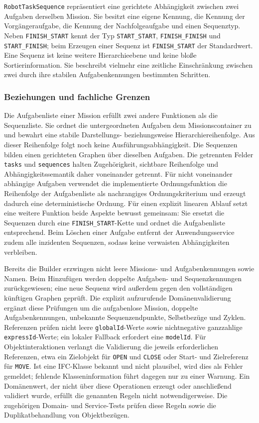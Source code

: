 \texttt{RobotTaskSequence} repräsentiert eine gerichtete Abhängigkeit zwischen zwei Aufgaben derselben Mission. Sie
besitzt eine eigene Kennung, die Kennung der Vorgängeraufgabe, die Kennung der Nachfolgeaufgabe und einen Sequenztyp.
Neben \texttt{FINISH\_START} kennt der Typ \texttt{START\_START}, \texttt{FINISH\_FINISH} und \texttt{START\_FINISH}; beim
Erzeugen einer Sequenz ist \texttt{FINISH\_START} der Standardwert. Eine Sequenz ist keine weitere Hierarchieebene und keine bloße
Sortierinformation. Sie beschreibt vielmehr eine zeitliche Einschränkung zwischen zwei durch ihre stabilen
Aufgabenkennungen bestimmten Schritten.

\subsubsection{Beziehungen und fachliche Grenzen}

Die Aufgabenliste einer Mission erfüllt zwei andere Funktionen als die Sequenzliste. Sie ordnet die untergeordneten
Aufgaben dem Missionscontainer zu und bewahrt eine stabile Darstellungs- beziehungsweise Hierarchiereihenfolge. Aus
dieser Reihenfolge folgt noch keine Ausführungsabhängigkeit. Die Sequenzen bilden einen gerichteten Graphen über
dieselben Aufgaben. Die getrennten Felder \texttt{tasks} und \texttt{sequences} halten Zugehörigkeit, sichtbare
Reihenfolge und Abhängigkeitssemantik daher voneinander getrennt. Für nicht voneinander abhängige Aufgaben verwendet
die implementierte Ordnungsfunktion die Reihenfolge der Aufgabenliste als nachrangiges Ordnungskriterium und erzeugt
dadurch eine deterministische Ordnung. Für einen explizit linearen Ablauf setzt eine weitere Funktion beide Aspekte
bewusst gemeinsam: Sie ersetzt die Sequenzen durch eine \texttt{FINISH\_START}-Kette und ordnet die Aufgabenliste
entsprechend. Beim Löschen einer Aufgabe entfernt der Anwendungsservice zudem alle inzidenten Sequenzen, sodass keine
verwaisten Abhängigkeiten verbleiben.

Bereits die Builder erzwingen nicht leere Missions- und Aufgabenkennungen sowie Namen. Beim Hinzufügen werden doppelte
Aufgaben- und Sequenzkennungen zurückgewiesen; eine neue Sequenz wird außerdem gegen den vollständigen künftigen Graphen
geprüft. Die explizit aufzurufende Domänenvalidierung ergänzt diese Prüfungen um die aufgabenlose Mission, doppelte
Aufgabenkennungen, unbekannte Sequenzendpunkte, Selbstbezüge und Zyklen. Referenzen prüfen nicht leere
\texttt{globalId}-Werte sowie nichtnegative ganzzahlige \texttt{expressId}-Werte; ein lokaler Fallback erfordert eine
\texttt{modelId}. Für Objektinteraktionen verlangt die Validierung die jeweils erforderlichen Referenzen, etwa ein
Zielobjekt für \texttt{OPEN} und \texttt{CLOSE} oder Start- und Zielreferenz für \texttt{MOVE}. Ist eine IFC-Klasse
bekannt und nicht plausibel, wird dies als Fehler gemeldet; fehlende Klasseninformation führt dagegen nur zu einer
Warnung. Ein Domänenwert, der nicht über diese Operationen erzeugt oder anschließend validiert wurde, erfüllt die
genannten Regeln nicht notwendigerweise. Die zugehörigen Domain- und Service-Tests prüfen diese Regeln sowie die
Duplikatbehandlung von Objektbezügen.

